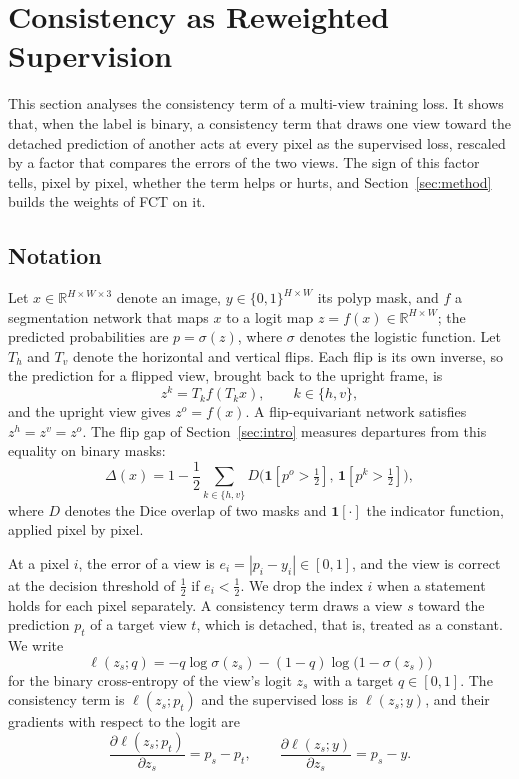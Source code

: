 \section{Consistency as Reweighted Supervision}
\label{sec:analysis}

This section analyses the consistency term of a multi-view training loss. It shows that, when the
label is binary, a consistency term that draws one view toward the detached prediction of another
acts at every pixel as the supervised loss, rescaled by a factor that compares the errors of the
two views. The sign of this factor tells, pixel by pixel, whether the term helps or hurts, and
Section~\ref{sec:method} builds the weights of FCT on it.

\subsection{Notation}
\label{sec:notation}

Let $x\in\mathbb{R}^{H\times W\times 3}$ denote an image, $y\in\{0,1\}^{H\times W}$ its polyp mask,
and $f$ a segmentation network that maps $x$ to a logit map $z=f(x)\in\mathbb{R}^{H\times W}$; the
predicted probabilities are $p=\sigma(z)$, where $\sigma$ denotes the logistic function. Let $T_h$ and
$T_v$ denote the horizontal and vertical flips. Each flip is its own inverse, so the prediction for a
flipped view, brought back to the upright frame, is
\begin{equation}
z^{k}=T_k f(T_k x),\qquad k\in\{h,v\},
\label{eq:views}
\end{equation}
and the upright view gives $z^{o}=f(x)$. A flip-equivariant network satisfies $z^{h}=z^{v}=z^{o}$.
The flip gap of Section~\ref{sec:intro} measures departures from this equality on binary masks:
\begin{equation}
\Delta(x)=1-\frac{1}{2}\sum_{k\in\{h,v\}} D\big(\mathbf{1}[p^{o}>\tfrac12],\,\mathbf{1}[p^{k}>\tfrac12]\big),
\label{eq:flipgap}
\end{equation}
where $D$ denotes the Dice overlap of two masks and $\mathbf{1}[\cdot]$ the indicator function, applied
pixel by pixel.

At a pixel $i$, the error of a view is $e_i=|p_i-y_i|\in[0,1]$, and the view is correct at the
decision threshold of $\frac12$ if $e_i<\frac12$. We drop the index $i$ when a statement holds for
each pixel separately. A consistency term draws a view $s$ toward the prediction $p_t$ of a target
view $t$, which is detached, that is, treated as a constant. We write
\begin{equation}
\ell(z_s;q)=-q\log\sigma(z_s)-(1-q)\log\big(1-\sigma(z_s)\big)
\label{eq:bce}
\end{equation}
for the binary cross-entropy of the view's logit $z_s$ with a target $q\in[0,1]$. The consistency
term is $\ell(z_s;p_t)$ and the supervised loss is $\ell(z_s;y)$, and their gradients with respect to
the logit are
\begin{equation}
\frac{\partial\ell(z_s;p_t)}{\partial z_s}=p_s-p_t,\qquad
\frac{\partial\ell(z_s;y)}{\partial z_s}=p_s-y.
\label{eq:grads}
\end{equation}

